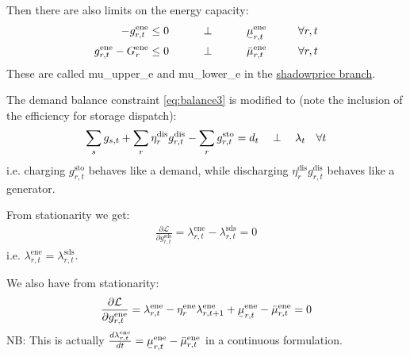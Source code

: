 \documentclass[final,3p,times]{elsarticle}
\def\l{\lambda} \def\K{\kappa} \def\m{\mu} \def\G{\Gamma} \def\d{\partial}
\def\cL{\mathcal{L}} \newcommand{\ubar}[1]{\text{\b{$#1$}}}
\begin{document}
Then there are also limits on the energy capacity:
\begin{align}
  -g^{\textrm{ene}}_{r,t}\leq 0 \hspace{1cm}\perp \hspace{1cm} \ubar{\mu}^{\textrm{ene}}_{r,t} \hspace{1cm} \forall r,t  \label{eq:storlower3} \\
  g^{\textrm{ene}}_{r,t} - G^{\textrm{ene}}_r \leq 0 \hspace{1cm}\perp \hspace{1cm} \bar{\mu}^{\textrm{ene}}_{r,t} \hspace{1cm} \forall r,t \label{eq:storupper3}
\end{align}
These are called mu\_upper\_e and mu\_lower\_e in the
\href{https://github.com/PyPSA/PyPSA/blob/shadowprices/pypsa/linopf.py}{shadowprice
branch}.


The demand balance constraint \eqref{eq:balance3} is modified to (note the
inclusion of the efficiency for storage dispatch):
\begin{align}
  \sum_s g_{s,t} + \sum_r \eta^{\textrm{dis}}_r g^{\textrm{dis}}_{r,t} - \sum_r g^{\textrm{sto}}_{r,t}  =  d_t \hspace{0.34cm}\perp \hspace{0.34cm} \l_t \hspace{0.34cm} \forall t \label{eq:balance4}
\end{align}
i.e. charging $g^{\textrm{sto}}_{r,t}$ behaves like a demand, while discharging
$\eta^{\textrm{dis}}_rg^{\textrm{dis}}_{r,t}$ behaves like a generator.

From stationarity we get:
\begin{align}
  \frac{\d \cL}{\d g^{\textrm{sds}}_{r,t}} = \lambda^{\textrm{ene}}_{r,t} - \lambda^{\textrm{sds}}_{r,t} = 0
\end{align}
i.e. $\lambda^{\textrm{ene}}_{r,t} = \lambda^{\textrm{sds}}_{r,t}$.

We also have from stationarity:
\begin{align}
  \frac{\d \cL}{\d g^{\textrm{ene}}_{r,t}} = \lambda^{\textrm{ene}}_{r,t} - \eta^{\textrm{ene}}_r\lambda^{\textrm{ene}}_{r,t+1} + \ubar{\mu}^{\textrm{ene}}_{r,t} -  \bar{\mu}^{\textrm{ene}}_{r,t} = 0
\end{align}
NB: This is actually $\frac{d \lambda^{\textrm{ene}}_{r,t}}{dt} =
\ubar{\mu}^{\textrm{ene}}_{r,t} - \bar{\mu}^{\textrm{ene}}_{r,t}$ in a
continuous formulation.
\end{document}
